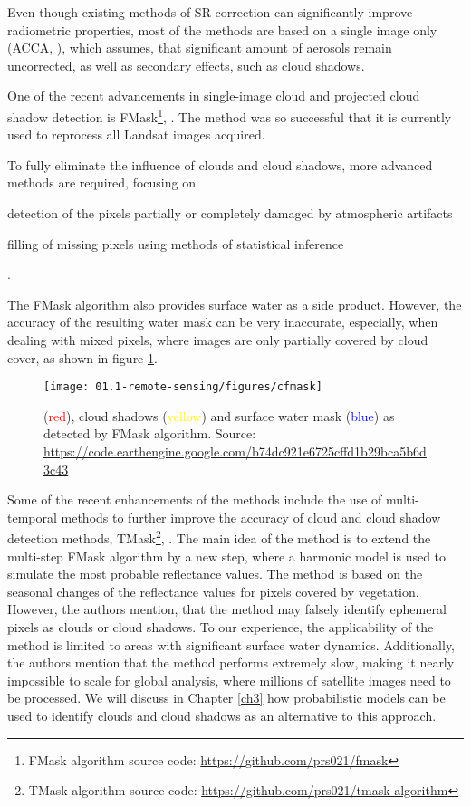 Even though existing methods of SR correction can significantly improve radiometric properties, most of the methods are based on a single image only (ACCA, \citep{irish2006characterization}), which assumes, that significant amount of aerosols remain uncorrected, as well as secondary effects, such as cloud shadows. 

One of the recent advancements in single-image cloud and projected cloud shadow detection is FMask\footnote{FMask algorithm source code: \url{https://github.com/prs021/fmask}}, \citep{zhu2012object, zhu2015improvement}. The method was so successful that it is currently used to reprocess all Landsat images acquired. 

To fully eliminate the influence of clouds and cloud shadows, more advanced methods are required, focusing on \begin{enumerate*}[label=(\emph{\alph*})]
	\item detection of the pixels partially or completely damaged by atmospheric artifacts
	\item filling of missing pixels using methods of statistical inference
\end{enumerate*}. 

The FMask algorithm also provides surface water as a side product. However, the accuracy of the resulting water mask can be very inaccurate, especially, when dealing with mixed pixels, where images are only partially covered by cloud cover, as shown in figure \ref{fig:cfmask}.

\begin{figure}[H]
	\texttt{[image: 01.1-remote-sensing/figures/cfmask]}
	\caption{(\textcolor{red}{red}), cloud shadows (\textcolor{yellow}{yellow}) and surface water mask (\textcolor{blue}{blue}) as detected by FMask algorithm. Source: \url{https://code.earthengine.google.com/b74dc921e6725cffd1b29bca5b6d3c43}}
	\label{fig:cfmask}
\end{figure}

Some of the recent enhancements of the methods include the use of multi-temporal methods to further improve the accuracy of cloud and cloud shadow detection methods, TMask\footnote{TMask algorithm source code: \url{https://github.com/prs021/tmask-algorithm}}, \citep{zhu2014automated}. The main idea of the method is to extend the multi-step FMask algorithm by a new step, where a harmonic model is used to simulate the most probable reflectance values. The method is based on the seasonal changes of the reflectance values for pixels covered by vegetation. However, the authors mention, that the method may falsely identify ephemeral pixels as clouds or cloud shadows. To our experience, the applicability of the method is limited to areas with significant surface water dynamics. Additionally, the authors mention that the method performs extremely slow, making it nearly impossible to scale for global analysis, where millions of satellite images need to be processed. We will discuss in Chapter \ref{ch3} how probabilistic models can be used to identify clouds and cloud shadows as an alternative to this approach. 

